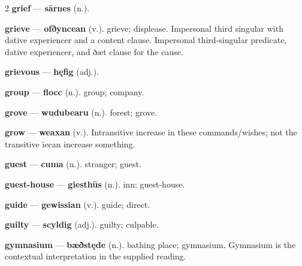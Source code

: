 \begin{multicols}{2}
\textbf{grief} — \textbf{sārnes} (n.).\par
\textbf{grieve} — \textbf{ofðyncean} (v.). grieve; displease. Impersonal third singular with dative experiencer and a content clause. Impersonal third-singular predicate, dative experiencer, and ðæt clause for the cause.\par
\textbf{grievous} — \textbf{hęfig} (adj.).\par
\textbf{group} — \textbf{flocc} (n.). group; company.\par
\textbf{grove} — \textbf{wudubearu} (n.). forest; grove.\par
\textbf{grow} — \textbf{weaxan} (v.). Intransitive increase in these commands/wishes; not the transitive īecan increase something.\par
\textbf{guest} — \textbf{cuma} (n.). stranger; guest.\par
\textbf{guest-house} — \textbf{giesthūs} (n.). inn; guest-house.\par
\textbf{guide} — \textbf{gewissian} (v.). guide; direct.\par
\textbf{guilty} — \textbf{scyldig} (adj.). guilty; culpable.\par
\textbf{gymnasium} — \textbf{bæðstęde} (n.). bathing place; gymnasium. Gymnasium is the contextual interpretation in the supplied reading.\par

\end{multicols}

